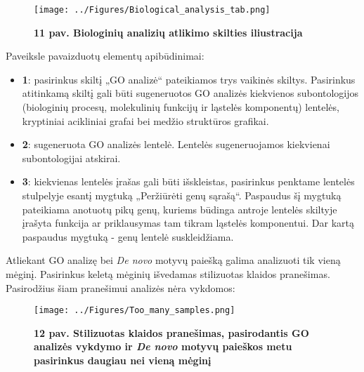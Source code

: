 \documentclass[12pt]{article}
\begin{document}
\begin{figure}[ht]
    \begin{center}
        \captionsetup{justification=centering}
        \texttt{[image: ../Figures/Biological\_analysis\_tab.png]}
        \vspace{-1.5\baselineskip}
        \caption*{\small\textbf{11 pav. Biologinių analizių atlikimo skilties
                                iliustracija}}
    \end{center}
\end{figure}

Paveiksle pavaizduotų elementų apibūdinimai:
\begin{itemize}
    \item \textbf{\large{1}}: pasirinkus skiltį „GO analizė“ pateikiamos
        trys vaikinės skiltys. Pasirinkus atitinkamą skiltį gali būti
        sugeneruotos GO analizės kiekvienos subontologijos (biologinių procesų,
        molekulinių funkcijų ir ląstelės komponentų) lentelės, kryptiniai
        acikliniai grafai bei medžio struktūros grafikai.
    \item \textbf{\large{2}}: sugeneruota GO analizės lentelė. Lentelės
        sugeneruojamos kiekvienai subontologijai atskirai.
    \item \textbf{\large{3}}: kiekvienas lentelės įrašas gali būti išskleistas,
        pasirinkus penktame lentelės stulpelyje esantį mygtuką „Peržiūrėti genų
        sąrašą“. Paspaudus šį mygtuką pateikiama anotuotų pikų genų, kuriems
        būdinga antroje lentelės skiltyje įrašyta funkcija ar priklausymas
        tam tikram ląstelės komponentui. Dar kartą paspaudus mygtuką - genų
        lentelė suskleidžiama.
\end{itemize}

\newpage

Atliekant GO analizę bei \emph{De novo} motyvų paiešką galima analizuoti tik
vieną mėginį. Pasirinkus keletą mėginių išvedamas stilizuotas klaidos
pranešimas. Pasirodžius šiam pranešimui analizės nėra vykdomos:

\begin{figure}[ht]
    \begin{center}
        \captionsetup{justification=centering}
        \texttt{[image: ../Figures/Too\_many\_samples.png]}
        \vspace{-1.5\baselineskip}
        \caption*{\small\textbf{12 pav. Stilizuotas klaidos pranešimas,
                                pasirodantis GO analizės vykdymo ir
                                \emph{De novo} motyvų paieškos metu pasirinkus
                                daugiau nei vieną mėginį}}
    \end{center}
\end{figure}
\end{document}
